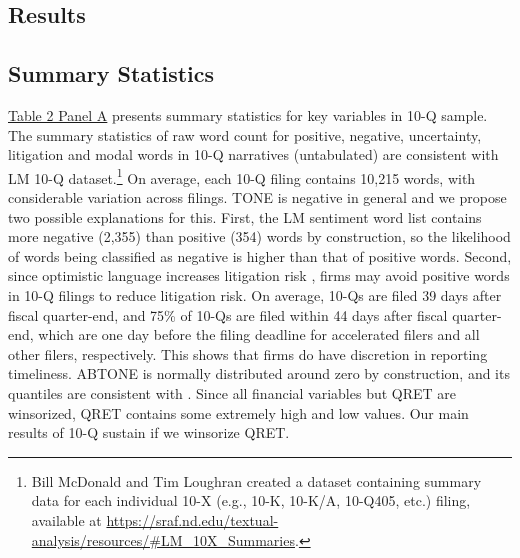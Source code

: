 \documentclass[a4paper]{article}
\begin{document}
\begin{spacing}{2}
\section{Results}
\subsection{Summary Statistics}
\hyperref[T2PA]{Table 2 Panel A} presents summary statistics for key variables in 10-Q sample. The summary statistics of raw word count for positive, negative, uncertainty, litigation and modal words in 10-Q narratives (untabulated) are consistent with LM 10-Q dataset.\footnote{Bill McDonald and Tim Loughran created a dataset containing summary data for each individual 10-X (e.g., 10-K, 10-K/A, 10-Q405, etc.) filing, available at \url{https://sraf.nd.edu/textual-analysis/resources/\#LM_10X_Summaries}.} On average, each 10-Q filing contains 10,215 words, with considerable variation across filings. TONE is negative in general and we propose two possible explanations for this. First, the LM sentiment word list contains more negative (2,355) than positive (354) words by construction, so the likelihood of words being classified as negative is higher than that of positive words. Second, since optimistic language increases litigation risk \cite{rogersDisclosureToneShareholder2011, cazierWhenAreFirms2020}, firms may avoid positive words in 10-Q filings to reduce litigation risk. On average, 10-Qs are filed 39 days after fiscal quarter-end, and 75\% of 10-Qs are filed within 44 days after fiscal quarter-end, which are one day before the filing deadline for accelerated filers and all other filers, respectively. This shows that firms do have discretion in reporting timeliness. ABTONE is normally distributed around zero by construction, and its quantiles are consistent with . Since all financial variables but QRET are winsorized, QRET contains some extremely high and low values. Our main results of 10-Q sustain if we winsorize QRET.


\end{spacing}
\end{document}
